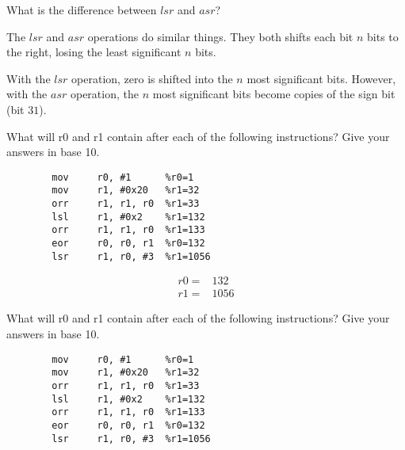 \documentclass[12pt]{article}
\newenvironment{solution}[2][Solution]{\begin{trivlist}
\item[\hskip \labelsep {\bfseries #1}]}{\end{trivlist}}
\newenvironment{problem}[2][Problem]{\begin{trivlist}
\item[\hskip \labelsep {\bfseries #1}\hskip \labelsep {\bfseries #2.}]}{\end{trivlist}}
\begin{document}

\begin{problem}{4.3}
    What is the difference between $lsr$ and $asr$?
\end{problem}

The $lsr$ and $asr$ operations do similar things. They both shifts each bit $n$ bits to the right, losing the least significant $n$ bits.

With the $lsr$ operation, zero is shifted into the $n$ most significant bits.
However, with the $asr$ operation, the $n$ most significant bits become copies of the sign bit (bit $31$).


\begin{problem}{4.2}
    What will r0 and r1 contain after each of the following instructions? Give your answers in base 10.
    \begin{verbatim}
        mov     r0, #1      %r0=1
        mov     r1, #0x20   %r1=32
        orr     r1, r1, r0  %r1=33
        lsl     r1, #0x2    %r1=132
        orr     r1, r1, r0  %r1=133
        eor     r0, r0, r1  %r0=132
        lsr     r1, r0, #3  %r1=1056
    \end{verbatim}

\end{problem}

\begin{solution}{}
    \begin{align*}
        r0 = & 132 \\
        r1 = & 1056
    \end{align*}
\end{solution}


\begin{problem}{4.2}
    What will r0 and r1 contain after each of the following instructions? Give your answers in base 10.
    \begin{verbatim}
        mov     r0, #1      %r0=1
        mov     r1, #0x20   %r1=32
        orr     r1, r1, r0  %r1=33
        lsl     r1, #0x2    %r1=132
        orr     r1, r1, r0  %r1=133
        eor     r0, r0, r1  %r0=132
        lsr     r1, r0, #3  %r1=1056
    \end{verbatim}

\end{problem}
\end{document}
